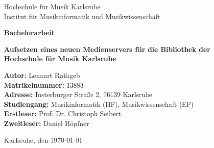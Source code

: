 \documentclass[12pt,a4paper]{article}
\begin{document}
\begin{titlepage}
    \centering
    {\Large Hochschule für Musik Karlsruhe \\ [1em]}
    {\large Institut für Musikinformatik und Musikwissenschaft \\[6em]}

    {\Large \textbf{Bachelorarbeit} \\[2em]}

    {\LARGE \textbf{Aufsetzen eines neuen Medienservers für die Bibliothek der Hochschule für Musik Karlsruhe} \\[6em]}

    \begin{minipage}{0.9\textwidth}
        \raggedright
        \textbf{Autor:} Lennart Rathgeb \\
        \textbf{Matrikelnummer:} 13883 \\
        \textbf{Adresse:} Insterburger Straße 2, 76139 Karlsruhe \\
        \textbf{Studiengang:} Musikinformatik (HF), Musikwissenschaft (EF) \\
        \textbf{Erstleser:} Prof. Dr. Christoph Seibert \\
        \textbf{Zweitleser:} Daniel Höpfner \\
    \end{minipage}

    \vfill
    Karlsruhe, den \today
\end{titlepage}

\newpage
\tableofcontents
\newpage
\end{document}
